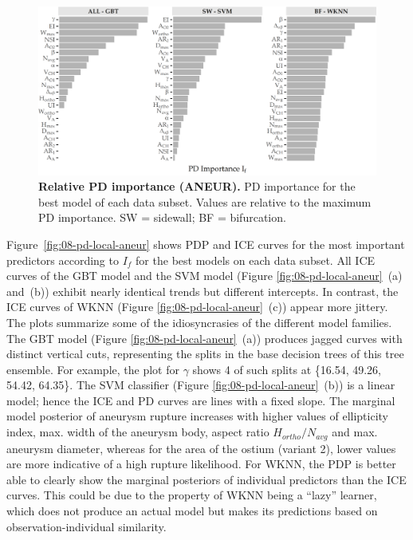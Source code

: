 \documentclass[
  oneside]{book}
\begin{document}
\begin{figure}[htb]

{\centering \includegraphics[width=1\linewidth]{figures/08-pd-global-aneur} 

}

\caption{\textbf{Relative PD importance (ANEUR).} PD importance for the best model of each data subset. Values are relative to the maximum PD importance. SW = sidewall; BF = bifurcation.}\label{fig:08-pd-global-aneur}
\end{figure}

Figure~\ref{fig:08-pd-local-aneur} shows PDP and ICE curves for the most important predictors according to \(I_f\) for the best models on each data subset.
All ICE curves of the GBT model and the SVM model (Figure \ref{fig:08-pd-local-aneur}~(a) and~(b)) exhibit nearly identical trends but different intercepts.
In contrast, the ICE curves of WKNN (Figure \ref{fig:08-pd-local-aneur}~(c)) appear more jittery.
The plots summarize some of the idiosyncrasies of the different model families.
The GBT model (Figure \ref{fig:08-pd-local-aneur}~(a)) produces jagged curves with distinct vertical cuts, representing the splits in the base decision trees of this tree ensemble.
For example, the plot for \(\gamma\) shows 4 of such splits at \{16.54, 49.26, 54.42, 64.35\}.
The SVM classifier (Figure \ref{fig:08-pd-local-aneur}~(b)) is a linear model; hence the ICE and PD curves are lines with a fixed slope.
The marginal model posterior of aneurysm rupture increases with higher values of ellipticity index, max. width of the aneurysm body, aspect ratio \(H_{ortho}/N_{avg}\) and max. aneurysm diameter, whereas for the area of the ostium (variant 2), lower values are more indicative of a high rupture likelihood.
For WKNN, the PDP is better able to clearly show the marginal posteriors of individual predictors than the ICE curves.
This could be due to the property of WKNN being a ``lazy'' learner, which does not produce an actual model but makes its predictions based on observation-individual similarity.
\end{document}
